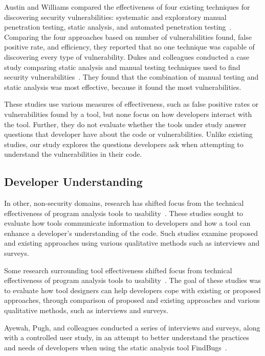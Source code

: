 \documentclass[conference]{IEEEtran}
\begin{document}
Austin and Williams compared the effectiveness of four existing techniques for discovering security vulnerabilities: systematic and exploratory manual  penetration testing, static analysis, and automated penetration testing~\cite{austin2011one}. 
Comparing the four approaches based on number of vulnerabilities found, false positive rate, and efficiency, they reported that no one technique was capable of discovering every type of vulnerability. 
Dukes and colleagues conducted a case study comparing static analysis and manual testing techniques used to find security vulnerabilities~\cite{dukes2013case}. 
They found that the combination of manual testing and static analysis was most effective, because it found the most vulnerabilities.


These studies use various measures of effectiveness, such as false positive rates or vulnerabilities found by a tool, but none focus on how developers interact with the tool. 
Further, they do not evaluate whether the tools under study answer questions that developer have about the code or vulnerabilities. 
Unlike existing studies, our study explores the questions developers ask when attempting to understand the vulnerabilities in their code.

\subsection{Developer Understanding}
\label{understanding}
In other, non-security domains, research has shifted focus from the technical effectiveness of program analysis tools to usability~\cite{johnson2013don, ayewah2008using, khoo2008path}. 
These studies sought to evaluate how tools communicate information to developers and how a tool can enhance a developer's understanding of the code. 
Such studies examine proposed and existing approaches using various qualitative methods such as interviews and surveys. 

Some research surrounding tool effectiveness shifted focus from technical effectiveness of program analysis tools to usability~\cite{johnson2013don, ayewah2008using, khoo2008path}. 
The goal of these studies was to evaluate how tool designers can help developers cope with existing or proposed approaches, through comparison of proposed and existing approaches and various qualitative methods, such as interviews and surveys.

Ayewah, Pugh, and colleagues conducted a series of interviews and surveys, along with a controlled user study, in an attempt to better understand the practices and needs of developers when using the static analysis tool FindBugs~\cite{ayewah2008report, ayewah2008using}.
\end{document}

